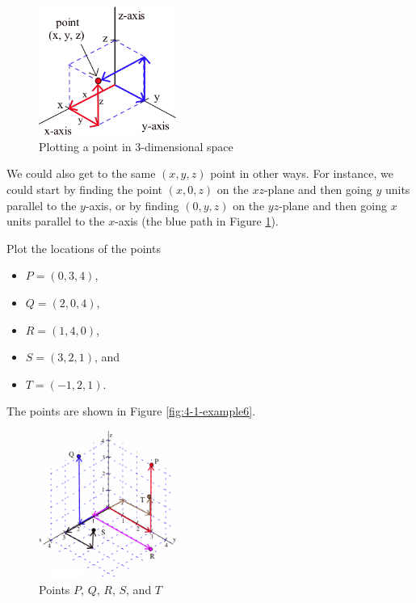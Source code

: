 \begin{figure}[!ht]
  \centering
    \includegraphics[width=0.4\textwidth]{img/chap4/image006.png}
    \caption{Plotting a point in 3-dimensional space}
    \label{fig:4-1-3dPoint2}
\end{figure}
We could also get to the same $(x,y,z)$ point in other ways. For instance, we could start by finding the point $(x,0,z)$ on the $xz$-plane and then going $y$ units parallel to the $y$-axis, or by finding $(0,y,z)$ on the $yz$-plane and then going $x$ units parallel to the $x$-axis (the blue path in Figure \ref{fig:4-1-3dPoint2}).

\begin{example}
Plot the locations of the points
\begin{itemize}
    \item $P=(0,3,4)$,
    \item $Q=(2,0,4)$,
    \item $R=(1,4,0)$,
    \item $S=(3,2,1)$, and
    \item $T=(-1,2,1)$.
\end{itemize}
\begin{solution} The points are shown in Figure \ref{fig:4-1-example6}.

  \begin{figure}[!ht]
    \centering
      \includegraphics[width=0.4\textwidth]{img/chap4/image007.png}
      \caption{Points $P$, $Q$, $R$, $S$, and $T$}
      \label{fig:4-1-ex6}
  \end{figure}
\end{solution}\end{example}

